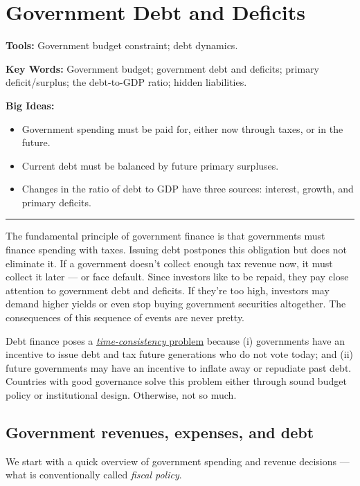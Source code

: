 \chapter{Government Debt and Deficits}\label{chp:dbdf}
\hypertarget{deficits}{}

\textbf{Tools:} Government budget constraint; debt dynamics.

\textbf{Key Words:} Government budget; government debt and deficits; primary deficit/surplus;
the debt-to-GDP ratio; hidden liabilities.

\textbf{Big Ideas:}
\vspace{-0.1in}
\begin{itemize}
\item Government spending must be paid for, either now through taxes, or in the
future.
\item Current debt must be balanced by future primary surpluses.
\item Changes in the ratio of debt to GDP have three sources:
interest, growth, and primary deficits.
\end{itemize}
\rule{\textwidth}{1pt}

The fundamental principle of government finance is that
governments must finance spending with taxes.
Issuing debt postpones this obligation but does not eliminate it.
If a government doesn't collect enough tax revenue now,
it must collect it later --- or face default.
Since investors like to be repaid, they pay close attention
to government debt and deficits.
If they're too high, investors may demand higher yields
or even stop buying government securities altogether.
The consequences of this sequence of events are never pretty.

Debt finance poses a \hyperref[sec:time_cons]{\textit{time-consistency} problem} because
(i) governments have an incentive to issue debt and tax future
generations who do not vote today;
and (ii) future governments may have an incentive to inflate away
or repudiate past debt.
Countries with good governance solve this problem either through
sound budget policy or institutional design.
Otherwise, not so much.


\section{Government revenues, expenses, and debt}

We start with a quick overview of
government spending and revenue decisions ---
what is conventionally called {\it fiscal policy\/}.

